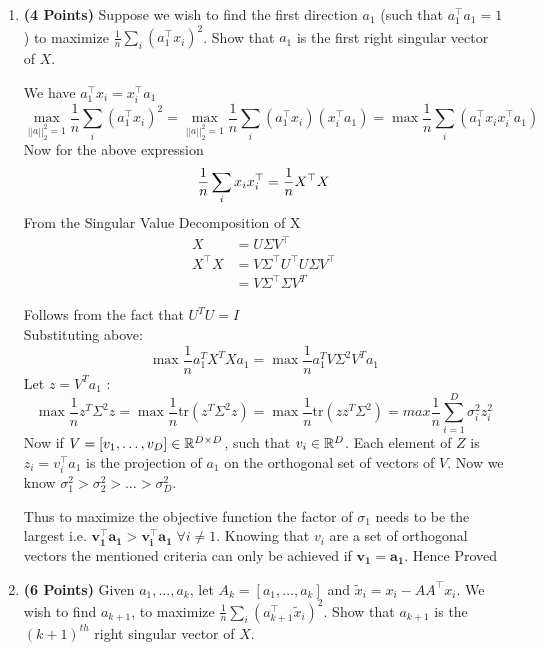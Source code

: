 \begin{enumerate}

\item  \textbf{(4 Points)}
Suppose we wish to find the first direction $a_1$ (such that $a_1^\top a_1 = 1$) to maximize $\frac{1}{n} \sum_i (a_1^\top x_i)^2$.
Show that $a_1$ is the first right singular vector of $X$.

\begin{soln}
    We have $a_1^\top x_i = x_i^\top a_1$
    $$
    \max_{||a||^2_2=1}\frac{1}{n}\sum_i(a_1^\top x_i)^2 = \max_{||a||^2_2=1}\frac{1}{n}\sum_i(a_1^\top x_i)(x_i^\top a_1) = \max\frac{1}{n}\sum_i(a_1^\top x_ix_i^\top a_1)
    $$
    Now for the above expression
    $$
        \frac{1}{n}\sum_ix_ix_i^\top=\frac{1}{n}X^\top X \\
    $$
    From the Singular Value Decomposition of X
    \begin{align*}
        X &= U \Sigma V^\top \\
        X^\top X &= V\Sigma^\top U^\top U\Sigma V^\top \\
        &= V\Sigma^\top\Sigma V^T 
    \end{align*}
    
    Follows from the fact that $U^TU =I$ \\
    Substituting above:\\
    $$
        \max\frac{1}{n} a_1^T X^T X a_1 = \max\frac{1}{n} a_1^T V \Sigma^2 V^T a_1
    $$
    Let $z=V^T a_1$ :  
    $$
        \max\frac{1}{n} z^T \Sigma^2 z = \max\frac{1}{n}\text{tr}(z^T \Sigma^2 z) =  \max\frac{1}{n}\text{tr}(zz^T \Sigma^2) = max\frac{1}{n} \sum_{i=1}^D \sigma_i^2z_i^2
    $$
    Now if $V = [v_1, \dots, v_D] \in \mathbb{R}^{D\times D}$, such that $v_i \in \mathbb{R}^D$. Each element of $Z$ is $z_i = v_i^\top a_1$ is the projection of $a_1$ on the orthogonal set of vectors of $V$. Now we know $\sigma_1^2 > \sigma_2^2 > \dots > \sigma_D^2$. 
    
    Thus to maximize the objective function the factor of $\sigma_1$ needs to be the largest i.e. $\mathbf{v_1^\top a_1 > v_i^\top a_1}\;\forall i\neq 1$. Knowing that $v_i$ are a set of orthogonal vectors the mentioned criteria can only be achieved if $\mathbf{v_1=a_1}$. Hence Proved
    
\end{soln}

\item  \textbf{(6 Points)}
Given $a_1, \dots, a_k$, let $A_k = [a_1, \dots, a_k]$ and 
$\tilde{x}_i = x_i - A A^\top x_i$. We wish to find $a_{k+1}$, to maximize
$\frac{1}{n} \sum_i (a_{k+1}^\top \tilde{x}_i)^2$. Show that $a_{k+1}$ is the
$(k+1)^{th}$ right singular vector of $X$.


\end{enumerate}
